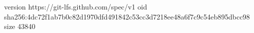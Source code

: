 version https://git-lfs.github.com/spec/v1
oid sha256:4dc72f1ab7b0c82d1970dfd491842c53cc3d7218ee48a6f7c9c54eb895dbcc98
size 43840
